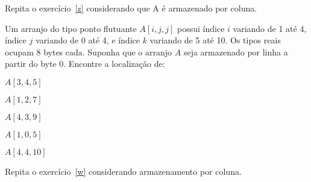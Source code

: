 \documentclass{compiladores}
\begin{document}
\begin{listanumerada}
\item Repita o exercício~\ref{z} considerando que A é armazenado por coluna.

\item \label{w} Um arranjo do tipo ponto flutuante $A[i,j,j]$ possui
  índice $i$ variando de 1 até 4, índice $j$ variando de 0 até 4, e
  índice $k$ variando de 5 até 10. Os tipos reais ocupam 8 bytes
  cada. Suponha que o arranjo $A$ seja armazenado por linha a partir
  do byte 0. Encontre a localização de:
  \begin{lista}
    \item $A[3,4,5]$
    \item $A[1,2,7]$
    \item $A[4,3,9]$
    \item $A[1,0,5]$
    \item $A[4,4,10]$
  \end{lista}

\item Repita o exercício~\ref{w} considerando armazenamento por coluna.
\end{listanumerada}
\end{document}
